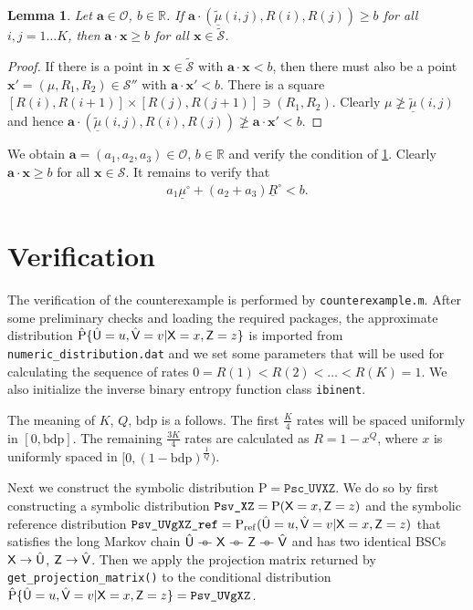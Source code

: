 \documentclass[a4paper,12pt]{scrartcl}
\newtheorem{lemma}{Lemma}
\newcommand{\hPcond}[2]{\ensuremath{\hat{\mathrm{P}}\{#1|#2\}}}
\newcommand{\Prob}{\ensuremath{\mathrm{P}}}
\newcommand{\ul}[1]{\ensuremath{\underline{#1}}}
\newcommand{\wt}[1]{\ensuremath{\widetilde{#1}}}
\newcommand{\vt}[1]{\ensuremath{\mathbf{#1}}}
\newcommand{\rv}[1]{\ensuremath{\mathsf{\uppercase{#1}}}}
\newcommand{\hrv}[1]{\ensuremath{\hat{\rv{#1}}}}
\newcommand{\SSS}{\ensuremath{\mathcal S}}
\newcommand{\OOO}{\ensuremath{\mathcal O}}
\newcommand{\RR}{\ensuremath{\mathbb R}}
\def\barcirc{\mathrel{\barcirci}}
\def\barcirci{{%
    \setbox0\hbox{\ensuremath{\relbar\!\!\relbar}}%
    \rlap{\hbox to \wd0{\hss\ensuremath{\circ}\hss}}\box0
}}
\newcommand{\mkv}{\ensuremath{\barcirc}}
\begin{document}
\begin{lemma}
  \label{lem:bound}
  Let $\vt a \in \OOO$, $b \in \RR$. If $\vt a \cdot (\ul{\wt\mu}(i,j), R(i), R(j)) \ge b$ for all $i,j = 1\dots K$, then $\vt a \cdot \vt x \ge b$ for all $\vt x \in \wt\SSS$.   
\end{lemma}
\begin{proof}
  If there is a point in $\vt x \in \wt\SSS$ with $\vt a \cdot \vt x < b$, then there must also be a point $\vt x' = (\mu, R_1, R_2)  \in \SSS''$ with $\vt a \cdot \vt x' < b$. There is a square $[R(i), R(i+1)] \times [R(j), R(j+1)] \ni (R_1, R_2)$. Clearly $\mu \not\ge \ul{\wt\mu}(i,j)$ and hence $\vt a \cdot (\ul{\wt\mu}(i,j), R(i), R(j)) \not\ge \vt a \cdot \vt x' < b$.
\end{proof}

We obtain $\vt a = (a_1, a_2, a_3) \in \OOO$, $b \in \RR$ and verify the condition of \cref{lem:bound}. Clearly $\vt a \cdot \vt x \ge b$ for all $\vt x \in \SSS$. It remains to verify that
\begin{align}
  a_1 \ul\mu^\circ + (a_2 + a_3) \ul R^\circ < b  .
\end{align}

\section{Verification}
\label{sec:verification}

The verification of the counterexample is performed by \texttt{counterexample.m}. After some preliminary checks and loading the required packages, the approximate distribution $\hPcond{\hrv u=u, \hrv v=v}{\rv x=x, \rv z=z}$ is imported from \texttt{numeric\_distribution.dat} and we set some parameters that will be used for calculating the sequence of rates $0 = R(1) < R(2) < \dots < R(K) = 1$. We also initialize the inverse binary entropy function class \texttt{ibinent}.



The meaning of $K$, $Q$, $\mathrm{bdp}$ is a follows. The first $\frac K4$ rates will be spaced uniformly in $[0, \mathrm{bdp}]$. The remaining $\frac{3K}{4}$ rates are calculated as $R=1-x^Q$, where $x$ is uniformly spaced in $[0, (1-\mathrm{bdp})^{\frac 1Q})$.

Next we construct the symbolic distribution $\mathrm{P} = \texttt{Psc\_UVXZ}$. We do so by first constructing a symbolic distribution $\texttt{Psv\_XZ} = \Prob(\rv x=x, \rv z=z)$ and the symbolic reference distribution $\texttt{Psv\_UVgXZ\_ref} = \mathrm{P}_{\mathrm{ref}}(\hrv u=u, \hrv v=v|\rv x=x, \rv z=z)$ that satisfies the long Markov chain $\hrv u \mkv \rv x \mkv \rv z \mkv \hrv v$ and has two identical BSCs $\rv x \to \hrv u$, $\rv z \to \hrv v$.
Then we apply the projection matrix returned by \texttt{get\_projection\_matrix()} to the conditional distribution $\hPcond{\hrv u=u, \hrv v=v}{\rv x=x, \rv z=z} = \texttt{Psv\_UVgXZ}$.
\end{document}
